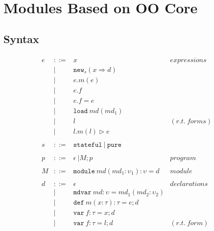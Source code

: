 \documentclass{llncs}
\newcommand{\keywadj}[1]{\mathtt{#1}}
\newcommand{\keyw}[1]{\keywadj{#1}~}
\begin{document}
\section{Modules Based on OO Core}

\subsection{Syntax}

\[
\begin{array}{lll}
\begin{array}{lllr}
e & ::= & x & expressions \\
& | & \keywadj{new}_{s}(x \Rightarrow d) \\
& | & e.m(e)\\
& | & e.f \\
& | & e.f = e \\
& | & \keyw{load} md(md_1)\\
& | & l & (r.t.~forms)\\
& | & l.m(l) \rhd e \\
&&\\
s & ::= & \keyw{stateful} | ~\keyw{pure} \\
&&\\
p & ::= & \epsilon~| M; p & program \\
&&\\
M & ::= & \keyw{module} md(md_1 : \upsilon_1) : \upsilon = d & module \\
&&\\
d & ::= & \epsilon & declarations \\
  & |   & \keyw{mdvar} md : \upsilon = md_1(md_2 : \upsilon_2) \\
  & |   & \keyw{def} m(x:\tau):\tau = e; d \\
  & |   & \keyw{var} f : \tau = x; d \\
  & |   & \keyw{var} f : \tau = l; d & (r.t.~form)\\
&&\\

\end{array}
\end{array}\]
\end{document}
